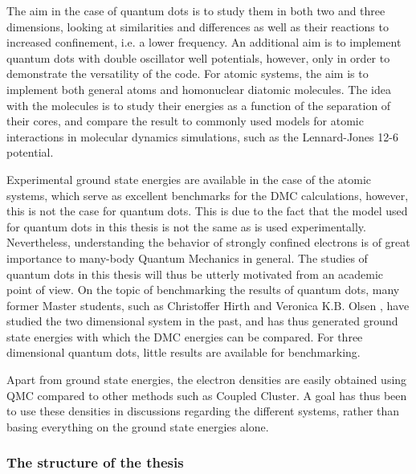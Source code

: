 The aim in the case of quantum dots is to study them in both two and three dimensions, looking at similarities and differences as well as their reactions to increased confinement, i.e. a lower frequency. An additional aim is to implement quantum dots with double oscillator well potentials, however, only in order to demonstrate the versatility of the code. For atomic systems, the aim is to implement both general atoms and homonuclear diatomic molecules. The idea with the molecules is to study their energies as a function of the separation of their cores, and compare the result to commonly used models for atomic interactions in molecular dynamics simulations, such as the Lennard-Jones 12-6 potential.  

Experimental ground state energies are available in the case of the atomic systems, which serve as excellent benchmarks for the DMC calculations, however, this is not the case for quantum dots. This is due to the fact that the model used for quantum dots in this thesis is not the same as is used experimentally. Nevertheless, understanding the behavior of strongly confined electrons is of great importance to many-body Quantum Mechanics in general. The studies of quantum dots in this thesis will thus be utterly motivated from an academic point of view. On the topic of benchmarking the results of quantum dots, many former Master students, such as Christoffer Hirth \cite{Hirth} and Veronica K.B. Olsen \cite{Olsen}, have studied the two dimensional system in the past, and has thus generated ground state energies with which the DMC energies can be compared. For three dimensional quantum dots, little results are available for benchmarking.

Apart from ground state energies, the electron densities are easily obtained using QMC compared to other methods such as Coupled Cluster. A goal has thus been to use these densities in discussions regarding the different systems, rather than basing everything on the ground state energies alone.

\subsubsection{The structure of the thesis}

